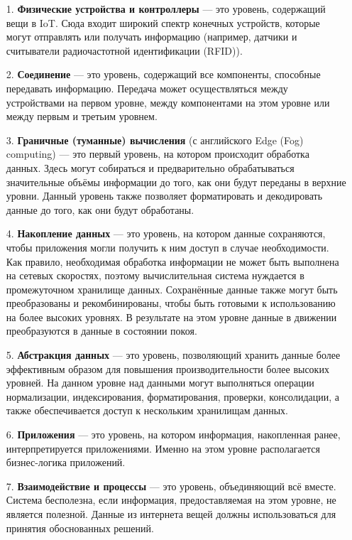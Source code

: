 \begin{enumerate}
	\item[1.] \textbf{Физические устройства и контроллеры} --- это уровень, содержащий вещи в IoT. Сюда входит широкий спектр конечных устройств, которые могут отправлять или получать информацию (например, датчики и считыватели радиочастотной идентификации (RFID)).
	\item[2.] \textbf{Соединение} --- это уровень, содержащий все компоненты, способные передавать информацию. Передача может осуществляться между устройствами на первом уровне, между компонентами на этом уровне или между первым и третьим уровнем.
	\item[3.] \textbf{Граничные (туманные) вычисления} (с английского Edge (Fog) computing) --- это первый уровень, на котором происходит обработка данных. Здесь могут собираться и предварительно обрабатываться значительные объёмы информации до того, как они будут переданы в верхние уровни. Данный уровень также позволяет форматировать и декодировать данные до того, как они будут обработаны. %
	\item[4.] \textbf{Накопление данных} --- это уровень, на котором данные сохраняются, чтобы приложения могли получить к ним доступ в случае необходимости. Как правило, необходимая обработка информации не может быть выполнена на сетевых скоростях, поэтому вычислительная система нуждается в промежуточном хранилище данных. Сохранённые данные также могут быть преобразованы и рекомбинированы, чтобы быть готовыми к использованию на более высоких уровнях. В результате на этом уровне данные в движении преобразуются в данные в состоянии покоя.
	\item[5.] \textbf{Абстракция данных} --- это уровень, позволяющий хранить данные более эффективным образом для повышения производительности более высоких уровней. На данном уровне над данными могут выполняться операции нормализации, индексирования, форматирования, проверки, консолидации, а также обеспечивается доступ к нескольким хранилищам данных.
	\item[6.] \textbf{Приложения} --- это уровень, на котором информация, накопленная ранее, интерпретируется приложениями. Именно на этом уровне располагается бизнес-логика приложений.
	\item[7.] \textbf{Взаимодействие и процессы} --- это уровень, объединяющий всё вместе. Система бесполезна, если информация, предоставляемая на этом уровне, не является полезной. Данные из интернета вещей должны использоваться для принятия обоснованных решений.
\end{enumerate}

